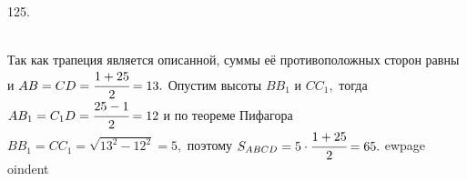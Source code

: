 125. \begin{figure}[ht!]
\end{figure}\\
Так как трапеция является описанной, суммы её противоположных сторон равны и $AB=CD=\cfrac{1+25}{2}=13.$ Опустим высоты $BB_1$ и $CC_1,$ тогда $AB_1=C_1D=\cfrac{25-1}{2}=12$ и по теореме Пифагора $BB_1=CC_1=\sqrt{13^2-12^2}=5,$ поэтому $S_{ABCD}=5\cdot\cfrac{1+25}{2}=65.$
ewpage
oindent
